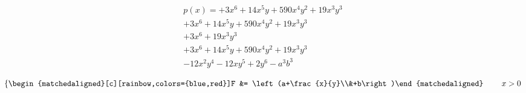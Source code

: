 \documentclass{article}
\begin{document}
\begin{multline}
	p(x) = +3x^6 + 14x^5y + 590x^4y^2 + 19x^3y^3\\ 
	+3x^6 + 14x^5y + 590x^4y^2 + 19x^3y^3\\ 
	+3x^6 + 19x^3y^3\\ 
	+3x^6 + 14x^5y + 590x^4y^2 + 19x^3y^3\\ 
	- 12x^2y^4 - 12xy^5 + 2y^6 - a^3b^3
\end{multline}

\[\left\{\begin{matchedaligned}[c][rainbow,colors={blue,red}]F &= \left(a+\frac{x}{y}\\&+b\right)\end{matchedaligned}\right.\qquad x>0\]
\end{document}
